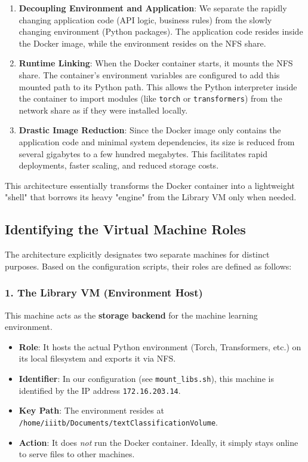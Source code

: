 \documentclass[11pt,a4paper]{article}
\begin{document}
\begin{enumerate}
    \item \textbf{Decoupling Environment and Application}: We separate the rapidly changing application code (API logic, business rules) from the slowly changing environment (Python packages). The application code resides inside the Docker image, while the environment resides on the NFS share.
    \item \textbf{Runtime Linking}: When the Docker container starts, it mounts the NFS share. The container's environment variables are configured to add this mounted path to its Python path. This allows the Python interpreter inside the container to import modules (like \texttt{torch} or \texttt{transformers}) from the network share as if they were installed locally.
    \item \textbf{Drastic Image Reduction}: Since the Docker image only contains the application code and minimal system dependencies, its size is reduced from several gigabytes to a few hundred megabytes. This facilitates rapid deployments, faster scaling, and reduced storage costs.
\end{enumerate}

This architecture essentially transforms the Docker container into a lightweight "shell" that borrows its heavy "engine" from the Library VM only when needed.

\subsection{Identifying the Virtual Machine Roles}

The architecture explicitly designates two separate machines for distinct purposes. Based on the configuration scripts, their roles are defined as follows:

\subsubsection{1. The Library VM (Environment Host)}
This machine acts as the \textbf{storage backend} for the machine learning environment.
\begin{itemize}
    \item \textbf{Role}: It hosts the actual Python environment (Torch, Transformers, etc.) on its local filesystem and exports it via NFS.
    \item \textbf{Identifier}: In our configuration (see \texttt{mount\_libs.sh}), this machine is identified by the IP address \texttt{172.16.203.14}.
    \item \textbf{Key Path}: The environment resides at \texttt{/home/iiitb/Documents/textClassificationVolume}.
    \item \textbf{Action}: It does \textit{not} run the Docker container. Ideally, it simply stays online to serve files to other machines.
\end{itemize}
\end{document}
